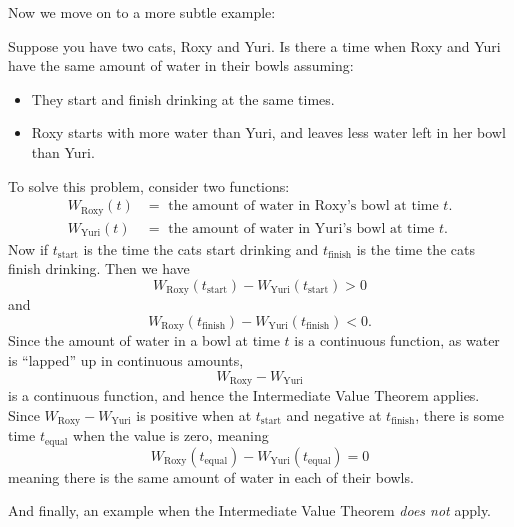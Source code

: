 \documentclass{ximera}
\begin{document}
Now we move on to a more subtle example:

\begin{example}
Suppose you have two cats, Roxy and Yuri. Is there a time when Roxy
and Yuri have the same amount of water in their bowls assuming:
  \begin{itemize}
  \item They start and finish drinking at the same times.
  \item Roxy starts with more water than Yuri, and leaves less water
    left in her bowl than Yuri.
  \end{itemize}


  To solve this problem, consider two functions:
  \begin{align*}
    W_{\mathrm{Roxy}}(t) &= \text{ the amount of water in Roxy's bowl at time $t$.}\\
    W_{\mathrm{Yuri}}(t) &= \text{ the amount of water in Yuri's bowl at time $t$.}
  \end{align*}
  Now if $t_\mathrm{start}$ is the time the cats start drinking and
  $t_\mathrm{finish}$ is the time the cats finish drinking. Then we have
  \[
  W_\mathrm{Roxy}(t_\mathrm{start})-W_{\mathrm{Yuri}}(t_\mathrm{start}) > 0%
  \]
  and
  \[
  W_\mathrm{Roxy}(t_\mathrm{finish})-W_{\mathrm{Yuri}}(t_\mathrm{finish}) < 0.
  \]
  Since the amount of water in a bowl at time $t$ is a continuous
  function, as water is ``lapped'' up in continuous amounts,
  \[
  W_\mathrm{Roxy}-W_{\mathrm{Yuri}}
  \]
  is a continuous function, and hence the Intermediate Value Theorem
  applies. Since $W_\mathrm{Roxy}-W_{\mathrm{Yuri}}$ is positive when
  at $t_\mathrm{start}$ and negative at $t_\mathrm{finish}$, there is
  some time $t_\mathrm{equal}$ when the value is zero, meaning
  \[
  W_\mathrm{Roxy}(t_\mathrm{equal})-  W_{\mathrm{Yuri}}(t_\mathrm{equal}) =0
  \]
  meaning there is the same amount of water in each of their bowls.
\end{example}


And finally, an example when the Intermediate Value Theorem
\textit{does not} apply.
\end{document}
